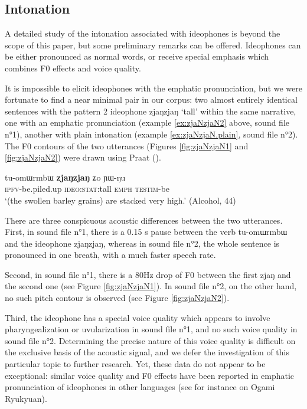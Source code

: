 \documentclass[oldfontcommands,oneside,a4paper,11pt]{article}
\newcommand{\ipa}[1]{{\phon \mbox{#1}}} %
\begin{document}
\subsection{Intonation}
A detailed study of the intonation associated with ideophones is beyond the scope of this paper, but some preliminary remarks can be offered. Ideophones can be either pronounced as normal words, or receive special emphasis which combines F0 effects and voice quality. 

It is impossible to elicit ideophones with the emphatic pronunciation, but we were fortunate to find a near minimal pair in our corpus: two almost entirely identical sentences with the pattern 2 ideophone \ipa{zjaŋzjaŋ} `tall' within the same narrative, one  with an emphatic pronunciation (example \ref{ex:zjaNzjaN2} above, sound file n°1), another with plain intonation (example \ref{ex:zjaNzjaN.plain}, sound file n°2). The F0 contours of the two utterances (Figures  \ref{fig:zjaNzjaN1} and  \ref{fig:zjaNzjaN2}) were drawn using Praat (\citealt{boersma.praat}).

  \begin{exe} 
\ex  \label{ex:zjaNzjaN.plain}
\gll 
 	\ipa{tu-omɯrmbɯ}  	\ipa{\textbf{zjaŋzjaŋ}}  	\ipa{ʑo}  	\ipa{ɲɯ-ŋu}  \\
  \textsc{ipfv}-be.piled.up \textsc{ideo:stat}:tall \textsc{emph} \textsc{testim}-be  \\
 \glt  `(the swollen barley grains) are stacked very high.'  (Alcohol, 44)
 \end{exe}
 
 
 There are three conspicuous acoustic differences between the two utterances. First, in sound file n°1, there is a 0.15 s pause between the verb 	\ipa{tu-omɯrmbɯ} and the ideophone \ipa{zjaŋzjaŋ}, whereas in sound file n°2, the whole sentence is pronounced in one breath, with a much faster speech rate. 
 
  Second, in sound file n°1, there is a 80Hz drop of F0 between the first \ipa{zjaŋ} and the second one (see Figure \ref{fig:zjaNzjaN1}). In sound file n°2, on the other hand, no such pitch contour is observed (see Figure \ref{fig:zjaNzjaN2}).

Third, the ideophone has a special voice quality which appears to involve pharyngealization or uvularization in sound file n°1, and no such voice quality     in sound file n°2. Determining the precise nature of this voice quality is difficult on the exclusive basis of the acoustic signal, and we defer the investigation of this particular topic to further research. Yet, these data do not appear to be exceptional: similar voice quality and F0 effects have been reported in emphatic pronunciation of ideophones in other languages (see for instance \citealt[109]{pellard09ogami} on Ogami Ryukyuan).
 
\end{document}
